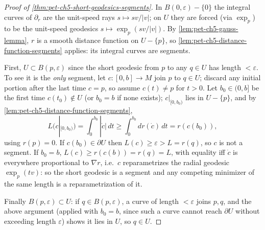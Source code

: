 \begin{proof}[Proof of \cref{thm:pet-ch5-short-geodesics-segments}]
  In $B(0,\varepsilon)-\{0\}$ the integral curves of $\partial_r$ are the unit-speed
  rays $s\mapsto sv/|v|$; on $U$ they are forced (via $\exp_p$) to be the unit-speed
  geodesics $s\mapsto\exp_p(sv/|v|)$. By \cref{lem:pet-ch5-gauss-lemma}, $r$ is a
  smooth distance function on $U-\{p\}$, so \cref{lem:pet-ch5-distance-function-segments}
  applies: its integral curves are segments.

  First, $U\subset B(p,\varepsilon)$ since the short geodesic from $p$ to any
  $q\in U$ has length $<\varepsilon$. To see it is the \emph{only} segment, let
  $c:[0,b]\to M$ join $p$ to $q\in U$; discard any initial portion after the last
  time $c=p$, so assume $c(t)\ne p$ for $t>0$. Let $b_0\in(0,b]$ be the first time
  $c(t_0)\notin U$ (or $b_0=b$ if none exists); $c|_{[0,b_0)}$ lies in $U-\{p\}$, and
  by \cref{lem:pet-ch5-distance-function-segments},
  \[
    L(c|_{[0,b_0)})=\int_0^{b_0}|\dot c|\,dt\ge\int_0^{b_0}dr(\dot c)\,dt=r(c(b_0)),
  \]
  using $r(p)=0$. If $c(b_0)\in\partial U$ then $L(c)\ge\varepsilon>L=r(q)$, so $c$ is
  not a segment. If $b_0=b$, $L(c)\ge r(c(b))=r(q)=L$, with equality iff $\dot c$ is
  everywhere proportional to $\nabla r$, i.e.\ $c$ reparametrizes the radial geodesic
  $\exp_p(tv)$: so the short geodesic is a segment and any competing minimizer of the
  same length is a reparametrization of it.

  Finally $B(p,\varepsilon)\subset U$: if $q\in B(p,\varepsilon)$, a curve of length
  $<\varepsilon$ joins $p,q$, and the above argument (applied with $b_0=b$, since
  such a curve cannot reach $\partial U$ without exceeding length $\varepsilon$)
  shows it lies in $U$, so $q\in U$.
\end{proof}

